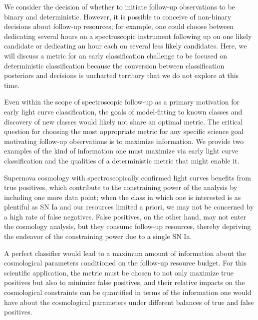 We consider the decision of whether to initiate follow-up observations to be binary and deterministic.
However, it is possible to conceive of non-binary decisions about follow-up resources; for example, one could choose between dedicating several hours on a spectroscopic instrument following up on one likely candidate or dedicating an hour each on several less likely candidates.
Here, we will discuss a metric for an early classification challenge to be focused on deterministic classification because the conversion between classification posteriors and decisions is uncharted territory that we do not explore at this time.

Even within the scope of spectroscopic follow-up as a primary motivation for early light curve classification, the goals of model-fitting to known classes and discovery of new classes would likely not share an optimal metric.
The critical question for choosing the most appropriate metric for any specific science goal motivating follow-up observations is to maximize information.
We provide two examples of the kind of information one must maximize via early light curve classification and the qualities of a deterministic metric that might enable it.

Supernova cosmology with spectroscopically confirmed light curves benefits from true positives, which contribute to the constraining power of the analysis by including one more data point;
when the class in which one is interested is as plentiful as SN Ia and our resources limited a priori, we may not be concerned by a high rate of false negatives.
False positives, on the other hand, may not enter the cosmology analysis, but they consume follow-up resources, thereby depriving the endeavor of the constraining power due to a single SN Ia.

A perfect classifier would lead to a maximum amount of information about the cosmological parameters conditioned on the follow-up resource budget.
For this scientific application, the metric must be chosen to not only maximize true positives but also to minimize false positives, and their relative impacts on the cosmological constraints can be quantified in terms of the information one would have about the cosmological parameters under different balances of true and false positives.

